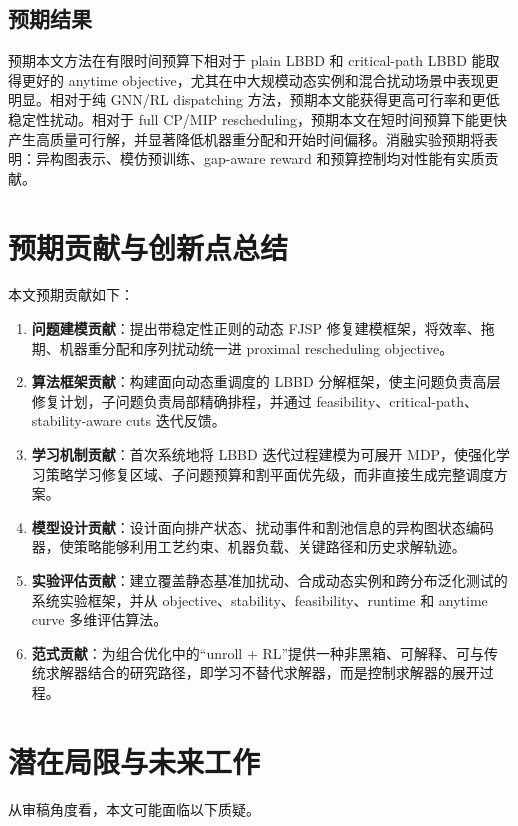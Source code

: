 \documentclass[UTF8,12pt,a4paper]{ctexart}
\begin{document}
\subsection{预期结果}

预期本文方法在有限时间预算下相对于 plain LBBD 和 critical-path LBBD 能取得更好的 anytime objective，尤其在中大规模动态实例和混合扰动场景中表现更明显。相对于纯 GNN/RL dispatching 方法，预期本文能获得更高可行率和更低稳定性扰动。相对于 full CP/MIP rescheduling，预期本文在短时间预算下能更快产生高质量可行解，并显著降低机器重分配和开始时间偏移。消融实验预期将表明：异构图表示、模仿预训练、gap-aware reward 和预算控制均对性能有实质贡献。

\section{预期贡献与创新点总结}

本文预期贡献如下：

\begin{enumerate}
    \item \textbf{问题建模贡献}：提出带稳定性正则的动态 FJSP 修复建模框架，将效率、拖期、机器重分配和序列扰动统一进 proximal rescheduling objective。
    \item \textbf{算法框架贡献}：构建面向动态重调度的 LBBD 分解框架，使主问题负责高层修复计划，子问题负责局部精确排程，并通过 feasibility、critical-path、stability-aware cuts 迭代反馈。
    \item \textbf{学习机制贡献}：首次系统地将 LBBD 迭代过程建模为可展开 MDP，使强化学习策略学习修复区域、子问题预算和割平面优先级，而非直接生成完整调度方案。
    \item \textbf{模型设计贡献}：设计面向排产状态、扰动事件和割池信息的异构图状态编码器，使策略能够利用工艺约束、机器负载、关键路径和历史求解轨迹。
    \item \textbf{实验评估贡献}：建立覆盖静态基准加扰动、合成动态实例和跨分布泛化测试的系统实验框架，并从 objective、stability、feasibility、runtime 和 anytime curve 多维评估算法。
    \item \textbf{范式贡献}：为组合优化中的“unroll + RL”提供一种非黑箱、可解释、可与传统求解器结合的研究路径，即学习不替代求解器，而是控制求解器的展开过程。
\end{enumerate}

\section{潜在局限与未来工作}

从审稿角度看，本文可能面临以下质疑。
\end{document}

